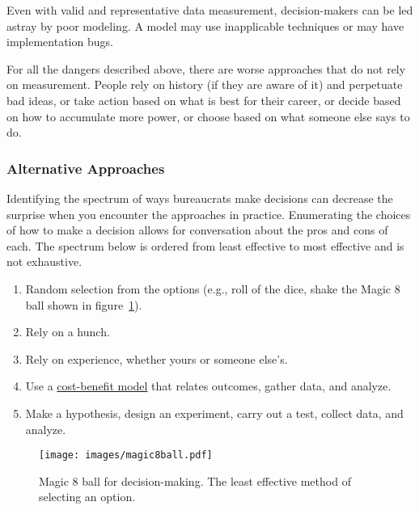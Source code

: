 Even with valid and representative data measurement, decision-makers can be led astray by poor modeling. A model may use inapplicable techniques or may have implementation bugs.

For all the dangers described above,
there are worse approaches that do not rely on measurement. People rely on history (if they are aware of it) and perpetuate bad ideas, or take action based on what is best for their career, or decide based on how to accumulate more power, or choose based on what someone else says to do.  

\subsubsection*{Alternative Approaches}
Identifying the spectrum of ways bureaucrats make decisions can decrease the surprise when you encounter the approaches in practice. 
Enumerating the choices of how to make a decision allows for conversation about the pros and cons of each. The spectrum below is ordered from least effective to most effective and is not exhaustive.
\begin{enumerate}
    \item Random selection from the options (e.g., roll of the dice, shake the Magic 8 ball shown in figure~\ref{fig:magic8ball}).
    \item Rely on a hunch.
    \item Rely on experience, whether yours or someone else's.
    \item Use a \href{https://en.wikipedia.org/wiki/Cost\%E2\%80\%93benefit_analysis}{cost-benefit model} that relates outcomes, 
    \iftoggle{WPinmargin}{\marginpar{$>$Wikipedia: cost-benefit analysis}}{} gather data, and analyze.
    \item Make a hypothesis, design an experiment, carry out a test, collect data, and analyze.
\end{enumerate}

\begin{figure}
    \centering
    \texttt{[image: images/magic8ball.pdf]}
    \caption{Magic 8 ball for decision-making. The least effective method of selecting an option.}
    \label{fig:magic8ball}
\end{figure}

